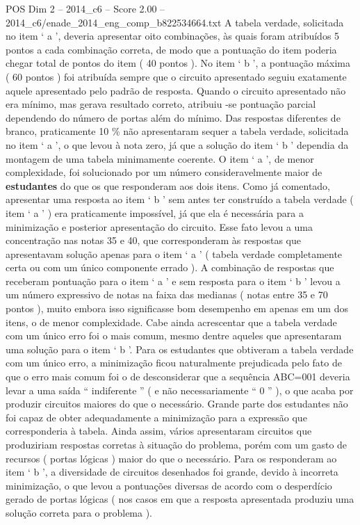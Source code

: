 \begin{textsample}{POS Dim 2 – 2014\_c6 – Score 2.00 – 2014\_c6/enade\_2014\_eng\_comp\_b822534664.txt}
A tabela verdade, solicitada no item ‘ a ’, deveria apresentar oito combinações, às quais foram atribuídos 5 pontos a cada combinação correta, de modo que a pontuação do item poderia chegar total de pontos do item ( 40 pontos ).
No item ‘ b ’, a pontuação máxima ( 60 pontos ) foi atribuída sempre que o circuito apresentado seguiu exatamente aquele apresentado pelo padrão de resposta.
Quando o circuito apresentado não era mínimo, mas gerava resultado correto, atribuiu -se pontuação parcial dependendo do número de portas além do mínimo.
Das respostas diferentes de branco, praticamente 10 \% não apresentaram sequer a tabela verdade, solicitada no item ‘ a ’, o que levou à nota zero, já que a solução do item ‘ b ’ dependia da montagem de uma tabela minimamente coerente.
O item ‘ a ’, de menor complexidade, foi solucionado por um número consideravelmente maior de \textbf{estudantes} do que os que responderam aos dois itens.
Como já comentado, apresentar uma resposta ao item ‘ b ’ sem antes ter construído a tabela verdade ( item ‘ a ’ ) era praticamente impossível, já que ela é necessária para a minimização e posterior apresentação do circuito.
Esse fato levou a uma concentração nas notas 35 e 40, que corresponderam às respostas que apresentavam solução apenas para o item ‘ a ’ ( tabela verdade completamente certa ou com um único componente errado ).
A combinação de respostas que receberam pontuação para o item ‘ a ’ e sem resposta para o item ‘ b ’ levou a um número expressivo de notas na faixa das medianas ( notas entre 35 e 70 pontos ), muito embora isso significasse bom desempenho em apenas em um dos itens, o de menor complexidade.
Cabe ainda acrescentar que a tabela verdade com um único erro foi o mais comum, mesmo dentre aqueles que apresentaram uma solução para o item ‘ b ’.
Para os estudantes que obtiveram a tabela verdade com um único erro, a minimização ficou naturalmente prejudicada pelo fato de que o erro mais comum foi o de desconsiderar que a sequência ABC=001 deveria levar a uma saída “ indiferente ” ( e não necessariamente “ 0 ” ), o que acaba por produzir circuitos maiores do que o necessário.
Grande parte dos estudantes não foi capaz de obter adequadamente a minimização para a expressão que corresponderia à tabela.
Ainda assim, vários apresentaram circuitos que produziriam respostas corretas à situação do problema, porém com um gasto de recursos ( portas lógicas ) maior do que o necessário.
Para os responderam ao item ‘ b ’, a diversidade de circuitos desenhados foi grande, devido à incorreta minimização, o que levou a pontuações diversas de acordo com o desperdício gerado de portas lógicas ( nos casos em que a resposta apresentada produziu uma solução correta para o problema ).

\end{textsample}
